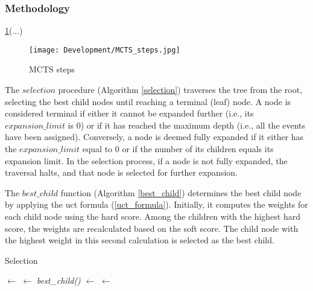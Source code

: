 \subsubsection{Methodology}

\ref{fig:mcts_steps}(...)

\begin{figure}[H]
      \centering
      \texttt{[image: Development/MCTS\_steps.jpg]}
      \caption[MCTS steps]
      {MCTS steps}
      \label{fig:mcts_steps}
\end{figure}

The \(selection\) procedure (Algorithm \ref{selection}) traverses the tree from the root, selecting the best child nodes until reaching a terminal (leaf) node. A node is considered terminal if either it cannot be expanded further (i.e., its \(expansion\_limit\) is 0) or if it has reached the maximum depth (i.e., all the events have been assigned). Conversely, a node is deemed fully expanded if it either has the \(expansion\_limit\) equal to 0 or if the number of its children equals its expansion limit. In the selection process, if a node is not fully expanded, the traversal halts, and that node is selected for further expansion.

The \(best\_child\) function (Algorithm \ref{best_child}) determines the best child node by applying the \ac{uct} formula (\ref{uct_formula}). Initially, it computes the weights for each child node using the hard score. Among the children with the highest hard score, the weights are recalculated based on the soft score. The child node with the highest weight in this second calculation is selected as the best child.

\begin{algorithm}
\caption{Selection}\label{selection}
\begin{algorithmic}[1]
\State {} $\gets$ 
    \State {}
    \EndIf
    \State {} $\gets$ \textit{best\_child()}
    \State {} $\gets$ 
\EndWhile
\State {} $\gets$ 
\EndProcedure
\end{algorithmic}
\end{algorithm}

